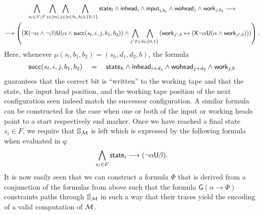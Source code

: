 \documentclass[times,envcountsame]{llncs}
\def\U{{\mathsf{U}}}
\def\X{{\mathsf{X}}}
\newcommand{\Soca}{\mathbb{S}}
\newcommand{\until}{\ensuremath{\U}}
\newcommand{\globally}{\ensuremath{\mathsf{G}}}
\begin{document}
\begin{multline*}
\bigwedge_{s_l\in S\setminus F}
\bigwedge_{i\in[m]}
\bigwedge_{j\in[n]}
\bigwedge_{b_1,b_2\in\{0,1\}}
\state_l\wedge\inh_i\wedge\iNp_{i,b_1}\wedge\woh_j\wedge
\work_{j,b_2} \longrightarrow\\
\longrightarrow
\left(
\left(\X(\neg\alpha \wedge \neg \beta)
\U(\alpha\wedge \succ(s_l,i,j,b_1,b_2)\right)
\wedge
\bigwedge_{j'\not= j}\bigwedge_{b\in\{0,1\}}
\left(\work_{j',b}\leftrightarrow
(\X\neg\alpha\U(\alpha\wedge\work_{j',b}))\right)
\right).
\end{multline*}
Here, whenever $\mu(s_l,b_1,b_2)=(s_h,d_1,d_2,b)$, the formula
\begin{align*}
\mathsf{succ}(s_l,i,j,b_1,b_2)\quad =\quad\mathsf{state}_h\wedge\mathsf{inhead}_{i+d_1}\wedge\mathsf{wohead}_{j+d_2}\wedge
\mathsf{work}_{j,b}
\end{align*}
guarantees that the correct bit is ``written'' to the working tape and
that the state, the input head position, and the working tape position
of the next configuration seen indeed match the successor
configuration. A similar formula can be constructed for the case when
one or both of the input or working heads point to a start
respectively end marker. Once we have reached a final state $s_i\in
F$, we require that $\Soca_\M$ is left which is expressed by the
following formula when evaluated in $q$:
\begin{align*}
   \bigwedge_{s_i\in F}\state_i \longrightarrow (\neg \alpha \until
   \beta).
\end{align*}
It is now easily seen that we can construct a formula $\Phi$ that is
derived from a conjunction of the formulas from above such that the
formula $\globally (\alpha \rightarrow \Phi)$ constraints paths
through $\Soca_\M$ in such a way that their traces yield the encoding
of a valid computation of $\mathcal{M}$.
\end{document}
